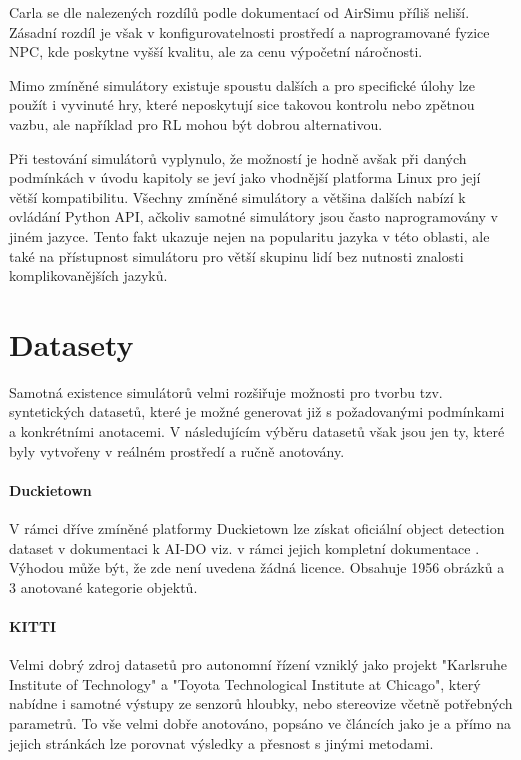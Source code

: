 \documentclass[czech, bc, kky, he, iso690numb]{fasthesis}
\begin{document}
	    		Carla se dle nalezených rozdílů podle dokumentací od AirSimu příliš neliší. Zásadní rozdíl je však v konfigurovatelnosti prostředí a naprogramované fyzice NPC, kde poskytne vyšší kvalitu, ale za cenu výpočetní náročnosti.
	    		
	    		Mimo zmíněné simulátory existuje spoustu dalších a pro specifické úlohy lze použít i vyvinuté hry, které neposkytují sice takovou kontrolu nebo zpětnou vazbu, ale například pro RL mohou být dobrou alternativou.
	    		
	    		Při testování simulátorů vyplynulo, že možností je hodně avšak při daných podmínkách v úvodu kapitoly se jeví jako vhodnější platforma Linux pro její větší kompatibilitu. Všechny zmíněné simulátory a většina dalších nabízí k ovládání Python API, ačkoliv samotné simulátory jsou často naprogramovány v jiném jazyce. Tento fakt ukazuje nejen na popularitu jazyka v této oblasti, ale také na přístupnost simulátoru pro větší skupinu lidí bez nutnosti znalosti komplikovanějších jazyků.
	    		
    	\section{Datasety}
    		Samotná existence simulátorů velmi rozšiřuje možnosti pro tvorbu tzv. syntetických datasetů, které je možné generovat již s požadovanými podmínkami a konkrétními anotacemi. V následujícím výběru datasetů však jsou jen ty, které byly vytvořeny v reálném prostředí a ručně anotovány.
    		
    		\paragraph{Duckietown}
    			V rámci dříve zmíněné platformy Duckietown \cite{Duckietown} lze získat oficiální object detection dataset v dokumentaci k AI-DO viz. \cite{dataset_duckietown} v rámci jejich kompletní dokumentace \cite{duckietown_documentation}. Výhodou může být, že zde není uvedena žádná licence. Obsahuje 1956 obrázků a 3 anotované kategorie objektů.
    			
    		\paragraph{KITTI}
    			Velmi dobrý zdroj datasetů pro autonomní řízení vzniklý jako projekt "Karlsruhe Institute of Technology" a "Toyota Technological Institute at Chicago", který nabídne i samotné výstupy ze senzorů hloubky, nebo stereovize včetně potřebných parametrů. To vše velmi dobře anotováno, popsáno ve článcích jako je \cite{dataset_KITTI_road} a přímo na jejich stránkách \cite{dataset_KITTI_web} lze porovnat výsledky a přesnost s jinými metodami.
    			
\end{document}
